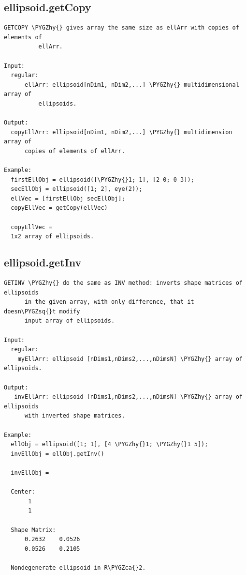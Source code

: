 \documentclass[letterpaper,10pt,english]{sphinxmanual}
\def\PYGZca{\char`\^}
\def\PYGZhy{\char`\-}
\def\PYGZsq{\char`\'}
\begin{document}
\subsection{ellipsoid.getCopy}
\label{chap_functions:ellipsoid-getcopy}
\begin{Verbatim}[commandchars=\\\{\}]
GETCOPY \PYGZhy{} gives array the same size as ellArr with copies of elements of
          ellArr.

Input:
  regular:
      ellArr: ellipsoid[nDim1, nDim2,...] \PYGZhy{} multidimensional array of
          ellipsoids.

Output:
  copyEllArr: ellipsoid[nDim1, nDim2,...] \PYGZhy{} multidimension array of
      copies of elements of ellArr.

Example:
  firstEllObj = ellipsoid([\PYGZhy{}1; 1], [2 0; 0 3]);
  secEllObj = ellipsoid([1; 2], eye(2));
  ellVec = [firstEllObj secEllObj];
  copyEllVec = getCopy(ellVec)

  copyEllVec =
  1x2 array of ellipsoids.
\end{Verbatim}


\subsection{ellipsoid.getInv}
\label{chap_functions:ellipsoid-getinv}
\begin{Verbatim}[commandchars=\\\{\}]
GETINV \PYGZhy{} do the same as INV method: inverts shape matrices of ellipsoids
      in the given array, with only difference, that it doesn\PYGZsq{}t modify
      input array of ellipsoids.

Input:
  regular:
    myEllArr: ellipsoid [nDims1,nDims2,...,nDimsN] \PYGZhy{} array of ellipsoids.

Output:
   invEllArr: ellipsoid [nDims1,nDims2,...,nDimsN] \PYGZhy{} array of ellipsoids
      with inverted shape matrices.

Example:
  ellObj = ellipsoid([1; 1], [4 \PYGZhy{}1; \PYGZhy{}1 5]);
  invEllObj = ellObj.getInv()

  invEllObj =

  Center:
       1
       1

  Shape Matrix:
      0.2632    0.0526
      0.0526    0.2105

  Nondegenerate ellipsoid in R\PYGZca{}2.
\end{Verbatim}
\end{document}
